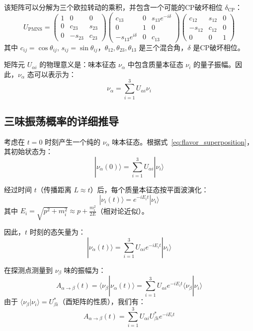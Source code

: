 该矩阵可以分解为三个欧拉转动的乘积，并包含一个可能的CP破坏相位 $\delta_{\mathrm{CP}}$：
\begin{equation}\label{eq:pmns_decomp}
U_{\mathrm{PMNS}} = \begin{pmatrix}
1 & 0 & 0 \\
0 & c_{23} & s_{23} \\
0 & -s_{23} & c_{23}
\end{pmatrix}
\begin{pmatrix}
c_{13} & 0 & s_{13}e^{-i\delta} \\
0 & 1 & 0 \\
-s_{13}e^{i\delta} & 0 & c_{13}
\end{pmatrix}
\begin{pmatrix}
c_{12} & s_{12} & 0 \\
-s_{12} & c_{12} & 0 \\
0 & 0 & 1
\end{pmatrix}
\end{equation}
其中 $c_{ij} = \cos\theta_{ij}$, $s_{ij} = \sin\theta_{ij}$，$\theta_{12}, \theta_{23}, \theta_{13}$ 是三个混合角，$\delta$ 是CP破坏相位。

矩阵元 $U_{\alpha i}$ 的物理意义是：味本征态 $\nu_\alpha$ 中包含质量本征态 $\nu_i$ 的量子振幅。因此，$\nu_\alpha$ 态可以表示为：
\begin{equation}\label{eq:flavor_superposition}
\nu_\alpha = \sum_{i=1}^3 U_{\alpha i} \nu_i
\end{equation}

\subsection{三味振荡概率的详细推导}

考虑在 $t=0$ 时刻产生一个纯的 $\nu_\alpha$ 味本征态。根据式~\eqref{eq:flavor_superposition}，其初始状态为：
\[
|\nu_\alpha(0)\rangle = \sum_{i=1}^3 U_{\alpha i} |\nu_i\rangle
\]

经过时间 $t$（传播距离 $L \approx t$）后，每个质量本征态按平面波演化：
\[
|\nu_i(t)\rangle = e^{-iE_i t} |\nu_i\rangle
\]
其中 $E_i = \sqrt{p^2 + m_i^2} \approx p + \frac{m_i^2}{2E}$（相对论近似）。

因此，$t$ 时刻的态矢量为：
\[
|\nu_\alpha(t)\rangle = \sum_{i=1}^3 U_{\alpha i} e^{-iE_i t} |\nu_i\rangle
\]

在探测点测量到 $\nu_\beta$ 味的振幅为：
\[
A_{\alpha\to\beta}(t) = \langle\nu_\beta|\nu_\alpha(t)\rangle = \sum_{i=1}^3 U_{\alpha i} e^{-iE_i t} \langle\nu_\beta|\nu_i\rangle
\]
由于 $\langle\nu_\beta|\nu_i\rangle = U_{\beta i}^*$（酉矩阵的性质），我们有：
\[
A_{\alpha\to\beta}(t) = \sum_{i=1}^3 U_{\alpha i} U_{\beta i}^* e^{-iE_i t}
\]


